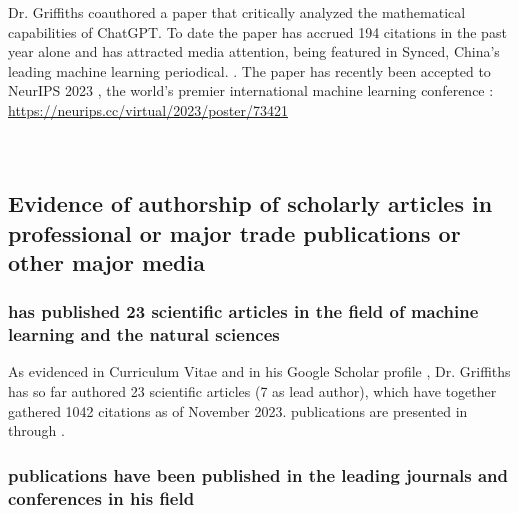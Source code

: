 \documentclass[11pt]{article}
\begin{document}

Dr. Griffiths coauthored a paper that critically analyzed the mathematical capabilities of ChatGPT. To date the paper has accrued 194 citations in the past year alone \cite{gscholar} and has attracted media attention, being featured in Synced, China’s leading machine learning periodical. \cite{media}. The paper has recently been accepted to NeurIPS 2023 \cite{neurips_papers}, the world's premier international machine learning conference \cite{gscholar}: \url{https://neurips.cc/virtual/2023/poster/73421} \\ 

 \\\\ \sk


\subsection{Evidence of authorship of scholarly articles in professional or major trade publications or other major media}
\label{authorship}

\subsubsection{\dr has published 23 scientific articles in the field  of machine learning and the natural sciences}

As evidenced in \drs Curriculum Vitae \cite{cv} and in his Google Scholar profile \cite{gscholar}, Dr. Griffiths has so far authored 23 scientific articles (7 as lead author), which have together gathered 1042 citations \cite{gscholar} as of November 2023. \drs publications are presented in \cite{conbo} through \cite{msci}.


\subsubsection{\drs publications have been published in the leading journals and conferences in his field}
\end{document}
